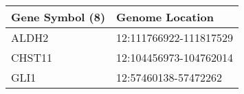 \begin{tabular}{ll}
\toprule
Gene Symbol (8) &        Genome Location \\
\midrule
          ALDH2 & 12:111766922-111817529 \\
         CHST11 & 12:104456973-104762014 \\
           GLI1 &   12:57460138-57472262 \\
\bottomrule
\end{tabular}

